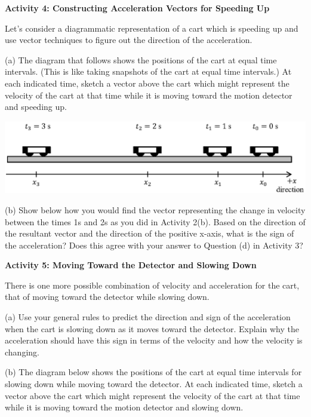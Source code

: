 \pagebreak[2]
\textbf{Activity 4: Constructing Acceleration Vectors for Speeding Up} 

Let's consider a diagrammatic representation of a cart which is speeding up
and use vector techniques to figure out the direction of the acceleration.

(a) The diagram that follows shows the positions of the cart at equal time intervals.
(This is like taking snapshots of the cart at equal time intervals.) At each
indicated time, sketch a vector above the cart which might represent the velocity
of the cart at that time while it is moving toward the motion detector and speeding
up.

{\par\centering \includegraphics{slowing/carts_speeding.eps} \par}

(b) Show below how you would find the vector representing the change in velocity
between the times 1s and 2s as you did in Activity 2(b). Based on the 
direction of the resultant vector and the direction of the positive x-axis, 
what is the sign of the acceleration? 
Does this agree with your answer to Question (d) in Activity 3?
\vspace{20mm}

\textbf{Activity 5: Moving Toward the Detector and Slowing Down }

There is one more possible combination of velocity and acceleration for the
cart, that of moving toward the detector while slowing down. 


(a) Use your general rules to predict the direction and sign of the acceleration
when the cart is slowing down as it moves toward the detector. Explain why the
acceleration should have this sign in terms of the velocity and how the 
velocity is changing. 
\answerspace{15mm}

(b) The diagram below shows the positions of the cart at equal time intervals
for slowing down while moving toward the detector. At each indicated time, 
sketch
a vector above the cart which might represent the velocity of the cart at that
time while it is moving toward the motion detector and slowing down.

